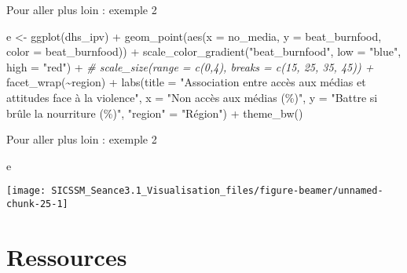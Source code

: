 \documentclass[
  ignorenonframetext,
]{beamer}
\newenvironment{Shaded}{\begin{snugshade}}{\end{snugshade}}
\newcommand{\AttributeTok}[1]{\textcolor[rgb]{0.77,0.63,0.00}{#1}}
\newcommand{\CommentTok}[1]{\textcolor[rgb]{0.56,0.35,0.01}{\textit{#1}}}
\newcommand{\FunctionTok}[1]{\textcolor[rgb]{0.00,0.00,0.00}{#1}}
\newcommand{\NormalTok}[1]{#1}
\newcommand{\OtherTok}[1]{\textcolor[rgb]{0.56,0.35,0.01}{#1}}
\newcommand{\SpecialCharTok}[1]{\textcolor[rgb]{0.00,0.00,0.00}{#1}}
\newcommand{\StringTok}[1]{\textcolor[rgb]{0.31,0.60,0.02}{#1}}
\begin{document}
\begin{frame}[fragile]{Pour aller plus loin : exemple 2}
\protect\hypertarget{pour-aller-plus-loin-exemple-2}{}
\begin{Shaded}
\begin{Highlighting}[]
\NormalTok{e }\OtherTok{\textless{}{-}} \FunctionTok{ggplot}\NormalTok{(dhs\_ipv) }\SpecialCharTok{+}
  \FunctionTok{geom\_point}\NormalTok{(}\FunctionTok{aes}\NormalTok{(}\AttributeTok{x =}\NormalTok{ no\_media, }\AttributeTok{y =}\NormalTok{ beat\_burnfood, }\AttributeTok{color =}\NormalTok{ beat\_burnfood)) }\SpecialCharTok{+}
  \FunctionTok{scale\_color\_gradient}\NormalTok{(}\StringTok{"beat\_burnfood"}\NormalTok{, }\AttributeTok{low =} \StringTok{"blue"}\NormalTok{, }\AttributeTok{high =} \StringTok{"red"}\NormalTok{) }\SpecialCharTok{+}
\CommentTok{\# scale\_size(range = c(0,4), breaks = c(15, 25, 35, 45)) +}
  \FunctionTok{facet\_wrap}\NormalTok{(}\SpecialCharTok{\textasciitilde{}}\NormalTok{region) }\SpecialCharTok{+}
  \FunctionTok{labs}\NormalTok{(}\AttributeTok{title =} \StringTok{"Association entre accès aux médias et attitudes face à la violence"}\NormalTok{,}
       \AttributeTok{x =} \StringTok{"Non accès aux médias (\%)"}\NormalTok{,}
       \AttributeTok{y =} \StringTok{"Battre si brûle la nourriture (\%)"}\NormalTok{,}
       \StringTok{"region"} \OtherTok{=} \StringTok{"Région"}\NormalTok{)  }\SpecialCharTok{+}
  \FunctionTok{theme\_bw}\NormalTok{() }
\end{Highlighting}
\end{Shaded}
\end{frame}

\begin{frame}[fragile]{Pour aller plus loin : exemple 2}
\protect\hypertarget{pour-aller-plus-loin-exemple-2-1}{}
\begin{Shaded}
\begin{Highlighting}[]
\NormalTok{e}
\end{Highlighting}
\end{Shaded}

\begin{center}\texttt{[image: SICSSM\_Seance3.1\_Visualisation\_files/figure-beamer/unnamed-chunk-25-1]} \end{center}
\end{frame}

\hypertarget{ressources}{%
\section{Ressources}\label{ressources}}
\end{document}
